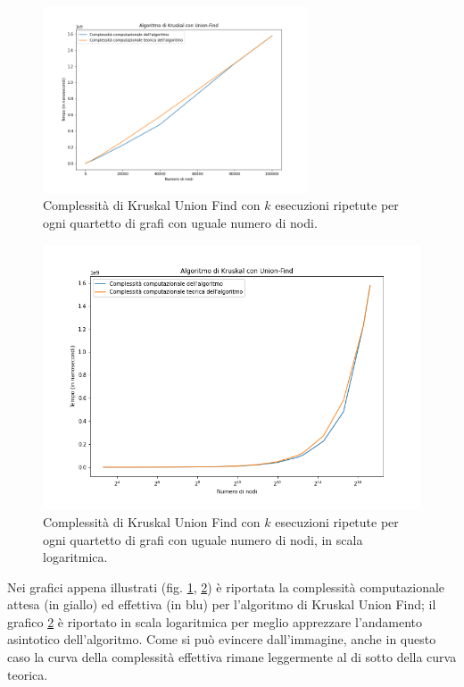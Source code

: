 \begin{figure}[H]
	\centering
	\includegraphics[width=0.70\textwidth]{res/images/graph-complexity/kruskal_union_find.png}
	\caption{Complessità di Kruskal Union Find con \(k\) esecuzioni ripetute per ogni quartetto di grafi con uguale numero di nodi.}
	\label{fig:kruskal_uf}
\end{figure}

\begin{figure}[H]
	\centering
	\includegraphics[width=1\textwidth]{res/images/graph-log/kruskal_union_find_scala_logaritmica.png}
	\caption{Complessità di Kruskal Union Find con \(k\) esecuzioni ripetute per ogni quartetto di grafi con uguale numero di nodi, in scala logaritmica.}
	\label{fig:kruskal_log}
\end{figure}

Nei grafici appena illustrati (fig. \ref{fig:kruskal_uf}, \ref{fig:kruskal_log}) è riportata la complessità computazionale attesa (in giallo) ed effettiva (in blu) per l'algoritmo di Kruskal Union Find; il grafico \ref{fig:kruskal_log} è riportato in scala logaritmica per meglio apprezzare l'andamento asintotico dell'algoritmo.
Come si può evincere dall'immagine, anche in questo caso la curva della complessità effettiva rimane leggermente al di sotto della curva teorica.


